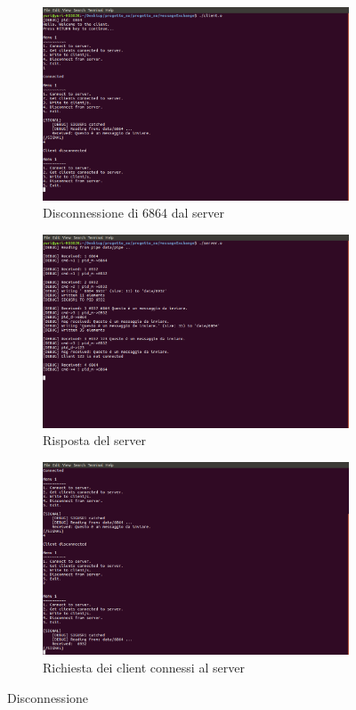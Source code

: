 \documentclass[a4paper]{article}
\begin{document}
\begin{figure}
\centering
\begin{subfigure}[b]{0.7\textwidth}
\includegraphics[width=\textwidth]{screenmsg/13_client_6864}
\caption{Disconnessione di 6864 dal server}
\end{subfigure}
\begin{subfigure}[b]{0.7\textwidth}
\includegraphics[width=\textwidth]{screenmsg/14_server}
\caption{Risposta del server}
\end{subfigure}
\begin{subfigure}[b]{0.7\textwidth}
\includegraphics[width=\textwidth]{screenmsg/15_client_6864}
\caption{Richiesta dei client connessi al server}
\end{subfigure}
\caption{Disconnessione}
\end{figure}
\end{document}
